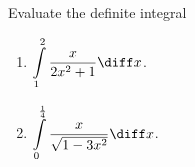Evaluate the definite integral 
\begin{enumerate}[ref={\fcProblemRef}]
\item \label{problemIntx/(2x^2+1)} $\displaystyle\int\limits_{1}^{2} \frac{x}{2x^2+1 }  \diff x$.

\item $\displaystyle\int\limits_{0}^{\frac{1}4}\frac{x }{\sqrt{1-3x^2}}\diff x$.

\end{enumerate}
